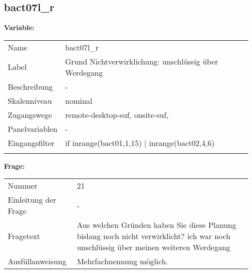 	
	
	\subsection{bact07l\_r}
	\label{subSection:bact07l_r}

	\noindent\textbf{Variable:}\\
		\begin{tabular}{lL{11.3cm}}
			\label{tableVariable:bact07l_r}
			Name & bact07l\_r \\
			Label & Grund Nichtverwirklichung: unschlüssig über Werdegang \\
			Beschreibung & - \\
			Skalenniveau & nominal \\
			Zugangswege &
				remote-desktop-suf,
				onsite-suf,
 \\
			Panelvariablen & -
			 \\
			Eingangsfilter & if inrange(bact01,1,15) | inrange(bact02,4,6) \\
 \\
		\end{tabular}

		\vspace*{1 cm}
		\noindent\textbf{Frage:}\\
		\begin{tabular}{lL{11.3cm}}
			\label{tableQuestion:bact07l_r}
			Nummer & 21 \\
			Einleitung der Frage & - \\
			Fragetext & Aus welchen Gründen haben Sie diese Planung bislang noch nicht verwirklicht?
ich war noch unschlüssig über meinen weiteren Werdegang \\
			Ausfüllanweisung & Mehrfachnennung möglich. \\
		\end{tabular}





